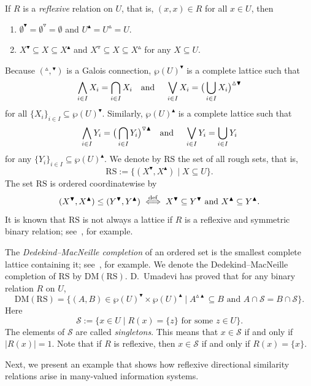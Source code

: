 \documentclass[11pt,a4paper]{amsart}
\newcommand{\UP}{\blacktriangle}
\newcommand{\DOWN}{\blacktriangledown}
\newcommand{\Up}{\vartriangle}
\newcommand{\Down}{\triangledown}
\theoremstyle{plain}
\theoremstyle{definition}
\theoremstyle{remark}
\numberwithin{equation}{section}
\begin{document}
If $R$ is a \emph{reflexive} relation
on $U$, that is, $(x,x) \in R$ for all $x \in U$, then
\begin{enumerate}[label={\rm (Ref\arabic*)}]
\item $\emptyset^\DOWN = \emptyset^\Down = \emptyset$ and  
$U^\UP = U^\Up = U$.
\item $X^\DOWN \subseteq X \subseteq X^\UP$ and
$X^\Down \subseteq X \subseteq X^\Up$ for any $X \subseteq U$.
\end{enumerate}
\medskip%
Because $({^\Up}, {^\DOWN})$ is a Galois connection, 
$\wp(U)^\DOWN$ is a complete lattice such that 
\[
\bigwedge_{i \in I} X_i = \bigcap_{i \in I} X_i
\text{\quad and \quad}
\bigvee_{i \in I} X_i = 
\big ( \bigcup_{i \in I} X_i \big)^{\Up\DOWN}
\]
for all $\{X_i\}_{i \in I} \subseteq \wp(U)^\DOWN$.
Similarly, $\wp(U)^\UP$ is a complete lattice such that 
\[
\bigwedge_{i \in I} Y_i = 
\big ( \bigcap_{i \in I} Y_i \big )^{\Down \UP}
\text{\quad and \quad}
\bigvee_{i \in I} Y_i = 
\bigcup_{i \in I} Y_i 
\]
for any $\{Y_i\}_{i \in I} \subseteq \wp(U)^\UP$. We denote by $\mathrm{RS}$ the set of all rough sets, that is,
\[ \mathrm{RS} := \{ (X^\DOWN, X^\UP) \mid X \subseteq U \}. \]
The set $\mathrm{RS}$ is ordered coordinatewise by
\[ (X^\DOWN, X^\UP) \leq (Y^\DOWN, Y^\UP) \overset{\rm def}{\iff} 
X^\DOWN \subseteq Y^\DOWN \ \text{and}  \ X^\UP \subseteq Y^\UP. \]
It is known that $\mathrm{RS}$ is not always a lattice if $R$ is a 
reflexive and symmetric binary relation; see~\cite{Jarvinen01}, for example.

The \emph{Dedekind--MacNeille completion} of an ordered set is the smallest complete lattice containing it; see~\cite{Davey02},
for example. We denote the Dedekind--MacNeille completion of $\mathrm{RS}$ by $\mathrm{DM(RS)}$. 
D.~Umadevi \cite{Umadevi2015} has proved that for any binary relation $R$ on $U$,
\[ \mathrm{DM(RS)} = \{ (A,B) \in \wp(U)^\DOWN \times \wp(U)^\UP \mid A^{\Up \UP} \subseteq B 
\text{ and }  A \cap \mathcal{S} = B \cap \mathcal{S} \} .\]
Here 
\[ \mathcal{S} := 
\{ x \in U \mid R(x) = \{z\} \text{ for some $z \in U$} \}. \]
The elements of $\mathcal{S}$ are called \emph{singletons}.
This means that $x \in \mathcal{S}$ if and only if
$|R(x)| = 1$. Note that if $R$ is reflexive, then $x \in \mathcal{S}$
if and only if $R(x) = \{x\}$.

Next, we present an example that shows how reflexive directional similarity relations arise in many-valued information systems.
\end{document}
